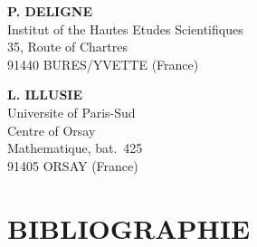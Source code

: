 \documentclass[12pt,a4paper]{article}
\theoremstyle{plain}
\theoremstyle{definition}
\theoremstyle{remark}
\begin{document}
\vspace{1cm}
\noindent
\begin{minipage}[t]{0.48\textwidth}
\textbf{P. DELIGNE}\\
Institut of the Hautes Etudes Scientifiques\\
35, Route of Chartres\\
91440 BURES/YVETTE (France)
\end{minipage}
\hfill
\begin{minipage}[t]{0.48\textwidth}
\textbf{L. ILLUSIE}\\
Universite of Paris-Sud\\
Centre of Orsay\\
Mathematique, bat.~425\\
91405 ORSAY (France)
\end{minipage}

\vspace{1cm}
\section*{BIBLIOGRAPHIE}
\end{document}
